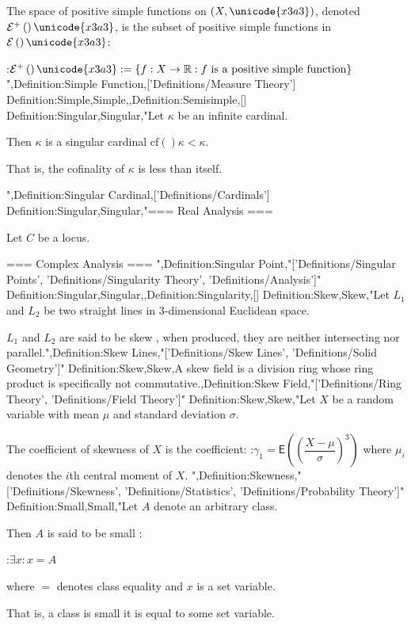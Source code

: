 The space of positive simple functions on $\left( X, \unicode{x3a3} \right)$, denoted $\mathcal E^+ \left(   \right)\unicode{x3a3}$, is the subset of positive simple functions in $\mathcal E \left(   \right)\unicode{x3a3}$:

:$\mathcal E^+ \left(   \right)\unicode{x3a3} := \left\lbrace f: X \to \mathbb R: \text {$f$ is a positive simple function}  \right\rbrace$
",Definition:Simple Function,['Definitions/Measure Theory']
Definition:Simple,Simple,,Definition:Semisimple,[]
Definition:Singular,Singular,"Let $\kappa$ be an infinite cardinal.


Then $\kappa$ is a singular cardinal  $\mathrm {cf}  \left(   \right)\kappa < \kappa$.

That is, the cofinality of $\kappa$ is less than itself.

",Definition:Singular Cardinal,['Definitions/Cardinals']
Definition:Singular,Singular,"=== Real Analysis ===

Let $C$ be a locus.


=== Complex Analysis ===
",Definition:Singular Point,"['Definitions/Singular Points', 'Definitions/Singularity Theory', 'Definitions/Analysis']"
Definition:Singular,Singular,,Definition:Singularity,[]
Definition:Skew,Skew,"Let $L_1$ and $L_2$ be two straight lines in $3$-dimensional Euclidean space.


$L_1$ and $L_2$ are said to be skew , when produced, they are neither intersecting nor parallel.",Definition:Skew Lines,"['Definitions/Skew Lines', 'Definitions/Solid Geometry']"
Definition:Skew,Skew,A skew field is a division ring whose ring product is specifically not commutative.,Definition:Skew Field,"['Definitions/Ring Theory', 'Definitions/Field Theory']"
Definition:Skew,Skew,"Let $X$ be a random variable with mean $\mu$ and standard deviation $\sigma$.

The coefficient of skewness of $X$ is the coefficient:
:$\gamma_1 = \mathsf E \left( \left( \dfrac {X - \mu} \sigma \right)^3 \right)$
where $\mu_i$ denotes the $i$th central moment of $X$.
",Definition:Skewness,"['Definitions/Skewness', 'Definitions/Statistics', 'Definitions/Probability Theory']"
Definition:Small,Small,"Let $A$ denote an arbitrary class.


Then $A$ is said to be small :

:$\exists x: x = A$

where $=$ denotes class equality and $x$ is a set variable.


That is, a class is small  it is equal to some set variable.


